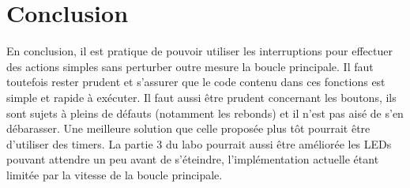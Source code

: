 \section{Conclusion}
En conclusion, il est pratique de pouvoir utiliser les interruptions pour effectuer des actions simples sans perturber outre mesure la boucle principale.
Il faut toutefois rester prudent et s'assurer que le code contenu dans ces fonctions est simple et rapide à exécuter.
Il faut aussi être prudent concernant les boutons, ils sont sujets à pleins de défauts (notamment les rebonds) et il n'est pas aisé de s'en débarasser. Une meilleure solution que celle proposée plus tôt pourrait être d'utiliser des timers.
La partie 3 du labo pourrait aussi être améliorée les LEDs pouvant attendre un peu avant de s'éteindre, l'implémentation actuelle étant limitée par la vitesse de la boucle principale.
